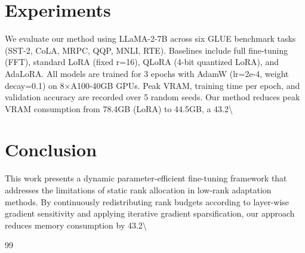 \documentclass[11pt,a4paper]{article}
\begin{document}
\section{Experiments}
We evaluate our method using LLaMA-2-7B across six GLUE benchmark tasks (SST-2, CoLA, MRPC, QQP, MNLI, RTE). Baselines include full fine-tuning (FFT), standard LoRA (fixed r=16), QLoRA (4-bit quantized LoRA), and AdaLoRA. All models are trained for 3 epochs with AdamW (lr=2e-4, weight decay=0.1) on 8×A100-40GB GPUs. Peak VRAM, training time per epoch, and validation accuracy are recorded over 5 random seeds. Our method reduces peak VRAM consumption from 78.4GB (LoRA) to 44.5GB, a 43.2\textbackslash{}%

\section{Conclusion}
This work presents a dynamic parameter-efficient fine-tuning framework that addresses the limitations of static rank allocation in low-rank adaptation methods. By continuously redistributing rank budgets according to layer-wise gradient sensitivity and applying iterative gradient sparsification, our approach reduces memory consumption by 43.2\textbackslash{}%


\begin{thebibliography}{99}
\end{thebibliography}
\end{document}
